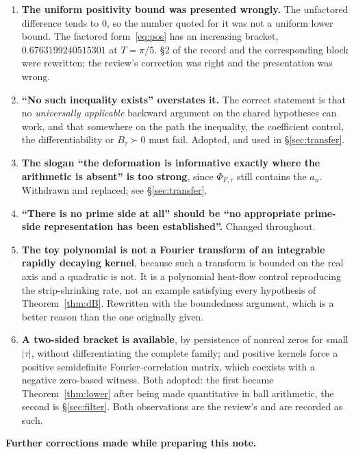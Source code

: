 \documentclass[11pt,a4paper]{article}
\theoremstyle{remark}
\begin{document}
\begin{enumerate}\itemsep3pt
\item \textbf{The uniform positivity bound was presented wrongly.} The unfactored difference
tends to $0$, so the number quoted for it was not a uniform lower bound. The factored
form~\eqref{eq:pos} has an increasing bracket, $0.6763199240515301$ at $T=\pi/5$. \S2 of the
record and the corresponding block were rewritten; the review's correction was right and the
presentation was wrong.

\item \textbf{``No such inequality exists'' overstates it.} The correct statement is that no
\emph{universally applicable} backward argument on the shared hypotheses can work, and that
somewhere on the path the inequality, the coefficient control, the differentiability or
$B_\tau\succ0$ must fail. Adopted, and used in \S\ref{sec:transfer}.

\item \textbf{The slogan ``the deformation is informative exactly where the arithmetic is
absent'' is too strong}, since $\Phi_{F,\tau}$ still contains the $a_n$. Withdrawn and
replaced; see \S\ref{sec:transfer}.

\item \textbf{``There is no prime side at all'' should be ``no appropriate prime-side
representation has been established''.} Changed throughout.

\item \textbf{The toy polynomial is not a Fourier transform of an integrable rapidly
decaying kernel}, because such a transform is bounded on the real axis and a quadratic is
not. It is a polynomial heat-flow control reproducing the strip-shrinking rate, not an
example satisfying every hypothesis of Theorem~\ref{thm:dB}. Rewritten with the
boundedness argument, which is a better reason than the one originally given.

\item \textbf{A two-sided bracket is available}, by persistence of nonreal zeros for small
$|\tau|$, without differentiating the complete family; and positive kernels force a positive
semidefinite Fourier-correlation matrix, which coexists with a negative zero-based witness.
Both adopted: the first became Theorem~\ref{thm:lower} after being made quantitative in ball
arithmetic, the second is \S\ref{sec:filter}. Both observations are the review's and are
recorded as such.
\end{enumerate}

\noindent\textbf{Further corrections made while preparing this note.}
\end{document}
